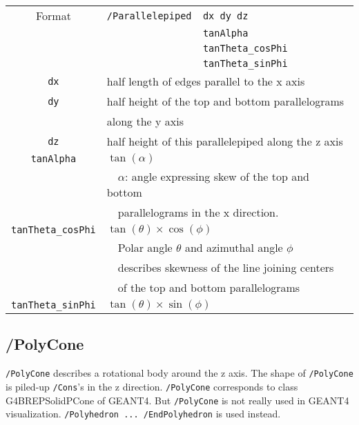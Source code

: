 \begin{tabular}{|c|l|}
\hline%
Format & \verb+/Parallelepiped  dx dy dz+ \\
       & \verb+                 tanAlpha+\\
       & \verb+                 tanTheta_cosPhi+\\
       & \verb+                 tanTheta_sinPhi+\\
\hline%
\verb+dx+     & half length of edges parallel to the x axis\\
\hline%
\verb+dy+     & half height of the top and bottom parallelograms\\
              & along the y axis \\
\hline%
\verb+dz+     & half height of this parallelepiped along the z axis\\
\hline%
\verb+tanAlpha+  & $\tan(\alpha)$\\
                 & \ \ $\alpha$: angle expressing skew of the top and bottom\\   
                 & \ \ parallelograms in the x direction.\\
\hline%
\verb+tanTheta_cosPhi+  &  $\tan(\theta)\times\cos(\phi)$ \\
                   & \ \ Polar angle $\theta$ and azimuthal angle $\phi$\\
		   & \ \ describes skewness of the line joining centers\\
                   & \ \ of the top and bottom parallelograms\\
\hline%
\verb+tanTheta_sinPhi+  &  $\tan(\theta)\times\sin(\phi)$\\
\hline%
\end{tabular}


\subsection{/PolyCone}  
\verb+/PolyCone+ describes a rotational body around the z axis.
The shape of \mbox{\verb+/PolyCone+} is piled-up \verb+/Cons+'s  
in the z direction.
\verb+/PolyCone+ corresponds to class G4BREPSolidPCone of GEANT4.
But \verb+/PolyCone+ is not really used in GEANT4 visualization.
\verb+/Polyhedron ... /EndPolyhedron+ is used instead.   
\vspace{.20in}

